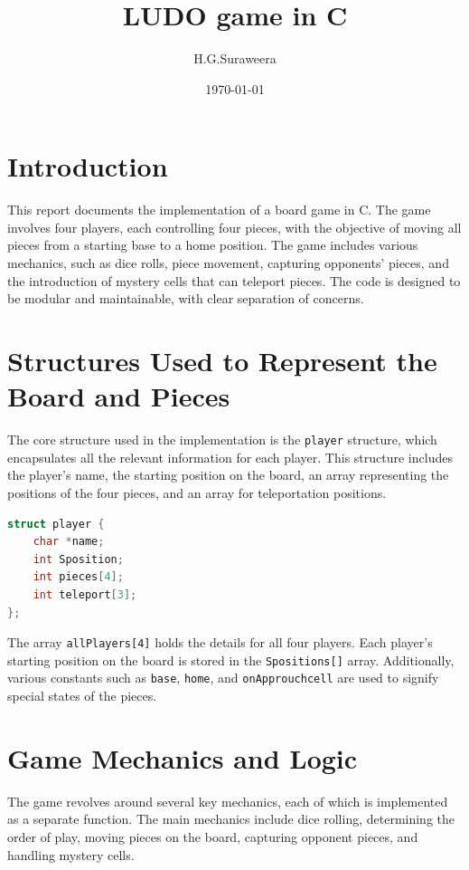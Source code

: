 \documentclass{article}
\title{LUDO game in C}
\author{H.G.Suraweera}
\date{\today}
\begin{document}
\maketitle

\section{Introduction}
This report documents the implementation of a board game in C. The game involves four players, each controlling four pieces, with the objective of moving all pieces from a starting base to a home position. The game includes various mechanics, such as dice rolls, piece movement, capturing opponents' pieces, and the introduction of mystery cells that can teleport pieces. The code is designed to be modular and maintainable, with clear separation of concerns.

\section{Structures Used to Represent the Board and Pieces}
The core structure used in the implementation is the \texttt{player} structure, which encapsulates all the relevant information for each player. This structure includes the player's name, the starting position on the board, an array representing the positions of the four pieces, and an array for teleportation positions.

\begin{lstlisting}[language=C, caption=Player Structure]
struct player {
    char *name;
    int Sposition;
    int pieces[4];
    int teleport[3];
};
\end{lstlisting}

The array \texttt{allPlayers[4]} holds the details for all four players. Each player's starting position on the board is stored in the \texttt{Spositions[]} array. Additionally, various constants such as \texttt{base}, \texttt{home}, and \texttt{onApprouchcell} are used to signify special states of the pieces.

\section{Game Mechanics and Logic}
The game revolves around several key mechanics, each of which is implemented as a separate function. The main mechanics include dice rolling, determining the order of play, moving pieces on the board, capturing opponent pieces, and handling mystery cells.
\end{document}
